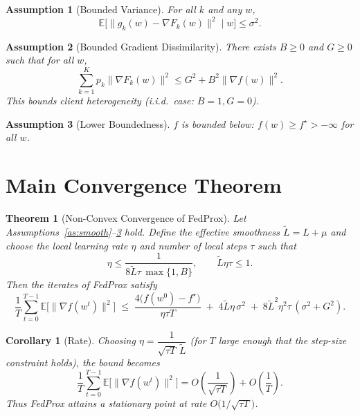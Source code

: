 \documentclass{article}
\newtheorem{theorem}{Theorem}
\newtheorem{assumption}{Assumption}
\newtheorem{corollary}{Corollary}
\begin{document}
\begin{assumption}[Bounded Variance]\label{as:var}
For all $k$ and any $w$,
\[
\mathbb{E}\big[\|g_k(w) - \nabla F_k(w)\|^2 \mid w\big] \le \sigma^2.
\]
\end{assumption}

\begin{assumption}[Bounded Gradient Dissimilarity]\label{as:diss}
There exists $B \ge 0$ and $G \ge 0$ such that for all $w$,
\[
\sum_{k=1}^{K} p_k \|\nabla F_k(w)\|^2 \le G^2 + B^2 \|\nabla f(w)\|^2 .
\]
This bounds client heterogeneity (i.i.d.\ case: $B=1, G=0$).
\end{assumption}

\begin{assumption}[Lower Boundedness]\label{as:lb}
$f$ is bounded below: $f(w) \ge f^\star > -\infty$ for all $w$.
\end{assumption}

\section*{Main Convergence Theorem}

\begin{theorem}[Non-Convex Convergence of FedProx]\label{thm:main}
Let Assumptions~\ref{as:smooth}--\ref{as:lb} hold. Define the effective smoothness $\tilde L = L + \mu$ and choose the local learning rate $\eta$ and number of local steps $\tau$ such that
\[
\eta \le \frac{1}{8 \tilde L \tau \, \max\{1,B\}}, \qquad \tilde L \eta \tau \le 1.
\]
Then the iterates of FedProx satisfy
\[
\frac{1}{T}\sum_{t=0}^{T-1} \mathbb{E}\big[\|\nabla f(w^t)\|^2\big]
\;\le\;
\frac{4\big(f(w^0) - f^\star\big)}{\eta \tau T}
\;+\; 4\tilde L \eta \,\sigma^2
\;+\; 8 \tilde L^2 \eta^2 \tau \,(\sigma^2 + G^2).
\]
\end{theorem}

\begin{corollary}[Rate]\label{cor:rate}
Choosing $\eta = \dfrac{1}{\sqrt{\tau T}\,\tilde L}$ (for $T$ large enough that the step-size constraint holds), the bound becomes
\[
\frac{1}{T}\sum_{t=0}^{T-1} \mathbb{E}\big[\|\nabla f(w^t)\|^2\big]
= O\!\left(\frac{1}{\sqrt{\tau T}}\right) + O\!\left(\frac{1}{T}\right).
\]
Thus FedProx attains a stationary point at rate $O\!\big(1/\sqrt{\tau T}\big)$.
\end{corollary}
\end{document}
